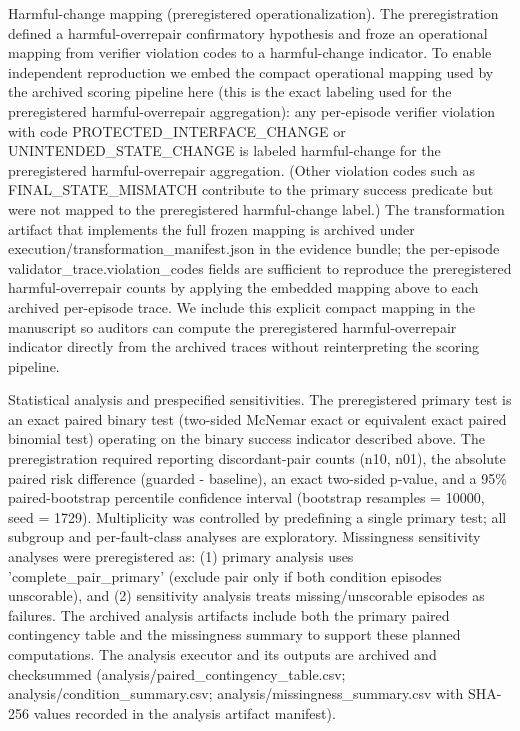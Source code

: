 \documentclass[conference]{IEEEtran}
\begin{document}
Harmful-change mapping (preregistered operationalization). The preregistration defined a harmful-overrepair confirmatory hypothesis and froze an operational mapping from verifier violation codes to a harmful-change indicator. To enable independent reproduction we embed the compact operational mapping used by the archived scoring pipeline here (this is the exact labeling used for the preregistered harmful-overrepair aggregation): any per-episode verifier violation with code PROTECTED\_INTERFACE\_CHANGE or UNINTENDED\_STATE\_CHANGE is labeled harmful-change for the preregistered harmful-overrepair aggregation. (Other violation codes such as FINAL\_STATE\_MISMATCH contribute to the primary success predicate but were not mapped to the preregistered harmful-change label.) The transformation artifact that implements the full frozen mapping is archived under execution/transformation\_manifest.json in the evidence bundle; the per-episode validator\_trace.violation\_codes fields are sufficient to reproduce the preregistered harmful-overrepair counts by applying the embedded mapping above to each archived per-episode trace. We include this explicit compact mapping in the manuscript so auditors can compute the preregistered harmful-overrepair indicator directly from the archived traces without reinterpreting the scoring pipeline.

Statistical analysis and prespecified sensitivities. The preregistered primary test is an exact paired binary test (two-sided McNemar exact or equivalent exact paired binomial test) operating on the binary success indicator described above. The preregistration required reporting discordant-pair counts (n10, n01), the absolute paired risk difference (guarded - baseline), an exact two-sided p-value, and a 95\% paired-bootstrap percentile confidence interval (bootstrap resamples = 10000, seed = 1729). Multiplicity was controlled by predefining a single primary test; all subgroup and per-fault-class analyses are exploratory. Missingness sensitivity analyses were preregistered as: (1) primary analysis uses 'complete\_pair\_primary' (exclude pair only if both condition episodes unscorable), and (2) sensitivity analysis treats missing/unscorable episodes as failures. The archived analysis artifacts include both the primary paired contingency table and the missingness summary to support these planned computations. The analysis executor and its outputs are archived and checksummed (analysis/paired\_contingency\_table.csv; analysis/condition\_summary.csv; analysis/missingness\_summary.csv with SHA-256 values recorded in the analysis artifact manifest).
\end{document}

